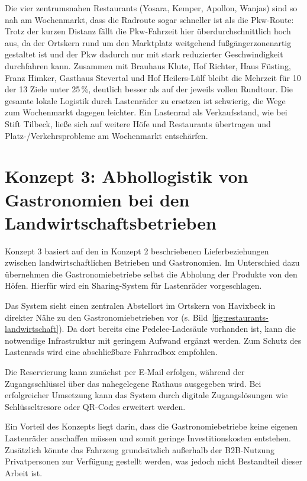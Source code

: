 \documentclass[a4paper,11pt,parskip=half,numbers=noenddot]{scrreprt}
\begin{document}
Die vier zentrumsnahen Restaurants (Yosara, Kemper, Apollon, Wanjas) sind so nah am Wochenmarkt, dass die Radroute sogar schneller ist als die Pkw-Route: Trotz der kurzen Distanz fällt die Pkw-Fahrzeit hier überdurchschnittlich hoch aus, da der Ortskern rund um den Marktplatz weitgehend fußgängerzonenartig gestaltet ist und der Pkw dadurch nur mit stark reduzierter Geschwindigkeit durchfahren kann. Zusammen mit Brauhaus Klute, Hof Richter, Haus Füsting, Franz Himker, Gasthaus Stevertal und Hof Heilers-Lülf bleibt die Mehrzeit für 10 der 13 Ziele unter 25\,\%, deutlich besser als auf der jeweils vollen Rundtour. Die gesamte lokale Logistik durch Lastenräder zu ersetzen ist schwierig, die Wege zum Wochenmarkt dagegen leichter. Ein Lastenrad als Verkaufsstand, wie bei Stift Tilbeck, ließe sich auf weitere Höfe und Restaurants übertragen und Platz-/Verkehrsprobleme am Wochenmarkt entschärfen.

\section{Konzept 3: Abhollogistik von Gastronomien bei den Landwirtschaftsbetrieben}

Konzept 3 basiert auf den in Konzept 2 beschriebenen Lieferbeziehungen zwischen landwirtschaftlichen Betrieben und Gastronomien. Im Unterschied dazu übernehmen die Gastronomiebetriebe selbst die Abholung der Produkte von den Höfen. Hierfür wird ein Sharing-System für Lastenräder vorgeschlagen.

Das System sieht einen zentralen Abstellort im Ortskern von Havixbeck in direkter Nähe zu den Gastronomiebetrieben vor (s. Bild~\ref{fig:restaurants-landwirtschaft}). Da dort bereits eine Pedelec-Ladesäule vorhanden ist, kann die notwendige Infrastruktur mit geringem Aufwand ergänzt werden. Zum Schutz des Lastenrads wird eine abschließbare Fahrradbox empfohlen.

Die Reservierung kann zunächst per E-Mail erfolgen, während der Zugangsschlüssel über das nahegelegene Rathaus ausgegeben wird. Bei erfolgreicher Umsetzung kann das System durch digitale Zugangslösungen wie Schlüsseltresore oder QR-Codes erweitert werden.

Ein Vorteil des Konzepts liegt darin, dass die Gastronomiebetriebe keine eigenen Lastenräder anschaffen müssen und somit geringe Investitionskosten entstehen. Zusätzlich könnte das Fahrzeug grundsätzlich außerhalb der B2B-Nutzung Privatpersonen zur Verfügung gestellt werden, was jedoch nicht Bestandteil dieser Arbeit ist.
\end{document}
